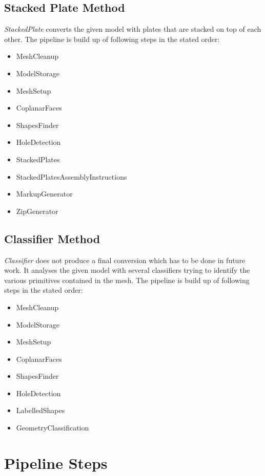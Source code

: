 \documentclass[../ClassicThesis.tex]{subfiles}
\begin{document}
\subsection{Stacked Plate Method}

\emph{StackedPlate} converts the given model with plates that are stacked on top of each other. The pipeline is build up of following steps in the stated order:

\begin{itemize}
    \item MeshCleanup
    \item ModelStorage
    \item MeshSetup
    \item CoplanarFaces
    \item ShapesFinder
    \item HoleDetection
    \item StackedPlates
    \item StackedPlatesAssemblyInstructions
    \item MarkupGenerator
    \item ZipGenerator
\end{itemize}


\subsection{Classifier Method}

\emph{Classifier} does not produce a final conversion which has to be done in future work. It analyses the given model with several classifiers trying to identify the various primitives contained in the mesh. The pipeline is build up of following steps in the stated order:

\begin{itemize}
    \item MeshCleanup
    \item ModelStorage
    \item MeshSetup
    \item CoplanarFaces
    \item ShapesFinder
    \item HoleDetection
    \item LabelledShapes
    \item GeometryClassification
\end{itemize}



\section{Pipeline Steps}
\end{document}
